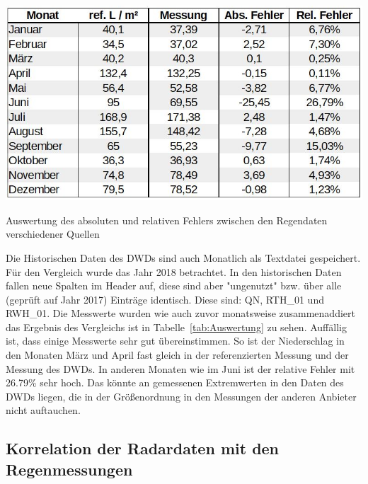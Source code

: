 \begin{table}[ht]
\centering
\includegraphics[width=\linewidth]{pics/Auswertung_Thomas}
\caption{Auswertung des absoluten und relativen Fehlers zwischen den Regendaten verschiedener Quellen}
\label{tab:Auswertung}
\end{table}
Die Historischen Daten des DWDs sind auch Monatlich als Textdatei gespeichert. Für den Vergleich wurde das Jahr 2018 betrachtet. In den historischen Daten fallen neue Spalten im Header auf, diese sind aber "ungenutzt" bzw. über alle (geprüft auf Jahr 2017) Einträge identisch. Diese sind: QN, RTH\_01 und RWH\_01. Die Messwerte wurden wie auch zuvor monatsweise zusammenaddiert das Ergebnis des Vergleichs ist in Tabelle~\ref{tab:Auswertung} zu sehen. 
Auffällig ist, dass einige Messwerte sehr gut übereinstimmen. So ist der Niederschlag in den Monaten März und April fast gleich in der referenzierten Messung und der Messung des DWDs. In anderen Monaten wie im Juni ist der relative Fehler mit 26.79\% sehr hoch. Das könnte an gemessenen Extremwerten in den Daten des DWDs liegen, die in der Größenordnung in den Messungen der anderen Anbieter nicht auftauchen.  

\subsection{Korrelation der Radardaten mit den Regenmessungen}

